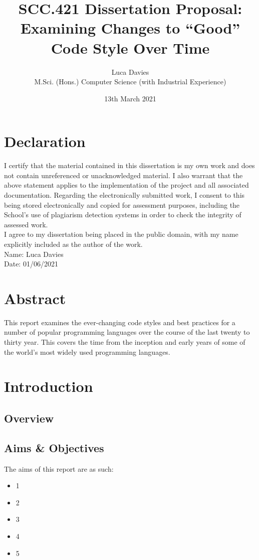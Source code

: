 \documentclass{article}
\title{\textbf{SCC.421 Dissertation Proposal: \\ Examining Changes to ``Good'' Code Style Over Time}}
\author{
Luca Davies \\ M.Sci. (Hons.) Computer Science (with Industrial Experience)}
\date{13th March 2021}
\begin{document}
\maketitle

\newpage
\section*{Declaration}
    I certify that the material contained in this dissertation is my own work and does not contain unreferenced or unacknowledged material. I also warrant that the above statement applies to the implementation of the project and all associated documentation. Regarding the electronically submitted work, I consent to this being stored electronically and copied for assessment purposes, including the School’s use of plagiarism detection systems in order to check the integrity of assessed work. \\
    I agree to my dissertation being placed in the public domain, with my name explicitly included as the author of the work. \\
    
    \noindent
    Name: Luca Davies\\
    Date: 01/06/2021
\newpage
\section*{Abstract}
    This report examines the ever-changing code styles and best practices for a number of popular programming languages over the course of the last  twenty to thirty year. This covers the time from the inception and early years of some of the world's most widely used programming languages.
    \newline
\newpage
\tableofcontents
\newpage


\section{Introduction}
    \subsection{Overview}
    \subsection{Aims \& Objectives}
        The aims of this report are as such:
        \begin{itemize}
            \item 1
            \item 2
            \item 3
            \item 4
            \item 5
        \end{itemize}
\end{document}

